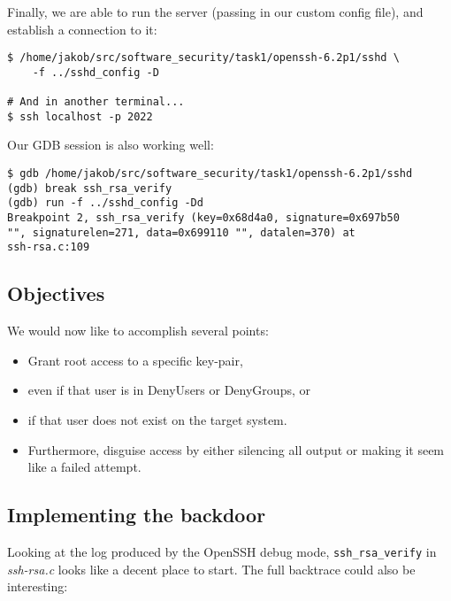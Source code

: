 \documentclass[a4paper,10pt]{article}
\begin{document}
Finally, we are able to run the server (passing in our custom config file),
and establish a connection to it:

\begin{verbatim}
$ /home/jakob/src/software_security/task1/openssh-6.2p1/sshd \
    -f ../sshd_config -D
    
# And in another terminal...
$ ssh localhost -p 2022
\end{verbatim}

Our GDB session is also working well:

\begin{verbatim}
$ gdb /home/jakob/src/software_security/task1/openssh-6.2p1/sshd
(gdb) break ssh_rsa_verify
(gdb) run -f ../sshd_config -Dd
Breakpoint 2, ssh_rsa_verify (key=0x68d4a0, signature=0x697b50
"", signaturelen=271, data=0x699110 "", datalen=370) at 
ssh-rsa.c:109
\end{verbatim}

\subsection{Objectives}

We would now like to accomplish several points:

\begin{itemize}
\item Grant root access to a specific key-pair, 
\item even if that user is in DenyUsers or DenyGroups, or
\item if that user does not exist on the target system.
\item Furthermore, disguise access by either silencing all
      output or making it seem like a failed attempt.
\end{itemize}

\subsection{Implementing the backdoor}

Looking at the log produced by the OpenSSH debug mode, \lstinline|ssh_rsa_verify|
in \emph{ssh-rsa.c} looks like a decent place to start. The full backtrace
could also be interesting:
\end{document}
